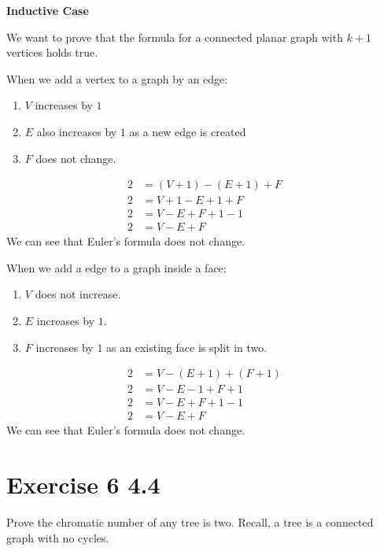 \documentclass{article}
\begin{document}
\textbf{Inductive Case}

We want to prove that the formula for a connected planar graph with $k+1$ vertices holds true.

When we add a vertex to a graph by an edge:

\begin{enumerate}
    \item $V$ increases by $1$
    \item $E$ also increases by $1$ as a new edge is created
    \item $F$ does not change.
\end{enumerate}

\begin{align*}
    2 &= (V + 1) - (E + 1) + F \\
    2 &= V +1 - E + 1 + F \\
    2 &= V - E + F + 1 - 1 \\
    2 &= V - E + F
    \end{align*}
We can see that Euler's formula does not change.
\vspace{1cm}

When we add a edge to a graph inside a face:

\begin{enumerate}
    \item $V$ does not increase.
    \item $E$ increases by $1$.
    \item $F$ increases by $1$ as an existing face is split in two.
\end{enumerate}

\begin{align*}
    2 &= V - (E + 1) + (F + 1) \\
    2 &= V - E - 1 + F + 1 \\
    2 &= V - E + F + 1 - 1 \\
    2 &= V - E + F
    \end{align*}
We can see that Euler's formula does not change.

\section*{Exercise 6 4.4}  

Prove the chromatic number of any tree is two. Recall, a tree is a connected graph with no cycles.%
\end{document}

